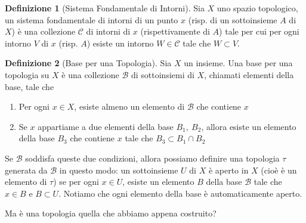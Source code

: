\documentclass[10pt,a4paper]{article}
\theoremstyle{definition}
\newtheorem{defi}{Definizione}
\theoremstyle{plain}
\theoremstyle{remark}
\theoremstyle{remark}
\newcommand{\B}{\mathcal{B}}
\begin{document}


\begin{defi}[Sistema Fondamentale di Intorni] Sia $X$ uno spazio topologico, un sistema fondamentale di intorni di un punto $x$ (risp. di un sottoinsieme $A$ di $X$) è una collezione $\mathcal{C}$ di intorni di $x$ (rispettivamente di $A$) tale per cui per ogni intorno $V$ di $x$ (risp. $A$) esiste un intorno $W \in \mathcal{C}$ tale che $W \subset V$.
\end{defi}




\begin{defi}[Base per una Topologia]  Sia $X$ un insieme. Una base per una topologia su $X$ è una collezione $\B$ di sottoinsiemi di $X$, chiamati elementi della base, tale che 
\begin{enumerate}
\item Per ogni $x \in X$, esiste almeno un elemento di $\B$ che contiene $x$
\item Se $x$ appartiame a due elementi della base $B_1, \ B_2$, allora esiste un elemento della base $B_3$ che contiene $x$ tale che $B_3 \subset B_1 \cap B_2$ 
\end{enumerate}

Se $\B$ soddisfa queste due condizioni, allora possiamo definire una topologia $\tau$ generata da $\B$ in questo modo: un sottoinsieme $U$ di $X$ è aperto in $X$ (cioè è un elemento di $\tau$) se per ogni $x \in U$, esiste un elemento $B$ della base $\B$ tale che $x \in B$ e $B \subset U$. Notiamo che ogni elemento della base è automaticamente aperto. 
\end{defi}


Ma è una topologia quella che abbiamo appena costruito?
\end{document}
